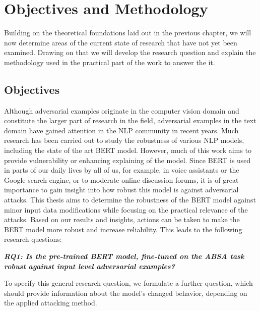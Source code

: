 \pagebreak

\section{Objectives and Methodology}
\label{sec:methodology}

Building on the theoretical foundations laid out in the previous chapter, we will now determine areas of the current state of research that have not yet been examined. Drawing on that we will develop the research question and explain the methodology used in the practical part of the work to answer the it. 

\subsection{Objectives}
\label{sec:objectives}

Although adversarial examples originate in the computer vision domain and constitute the larger part of research in the field, adversarial examples in the text domain have gained attention in the NLP community in recent years. Much research has been carried out to study the robustness of various NLP models, including the state of the art BERT model. 
However, much of this work aims to provide vulnerability or enhancing explaining of the model. 
Since BERT is used in parts of our daily lives by all of us, for example, in voice assistants or the Google search engine, or to moderate online discussion forums, it is of great importance to gain insight into how robust this model is against adversarial attacks. 
This thesis aims to determine the robustness of the BERT model against minor input data modifications while focusing on the practical relevance of the attacks. Based on our results and insights, actions can be taken to make the BERT model more robust and increase reliability. 
This leads to the following research questions:

\textbf{\textit{RQ1: Is the pre-trained BERT model, fine-tuned on the ABSA task robust against input level adversarial examples?}}

To specify this general research question, we formulate a further question, which should provide information about the model's changed behavior, depending on the applied attacking method. 

